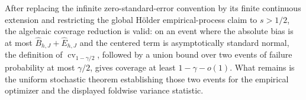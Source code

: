 After replacing the infinite zero-standard-error convention by its finite continuous extension and restricting the global Hölder empirical-process claim to \(s>1/2\), the algebraic coverage reduction is valid: on an event where the absolute bias is at most \(\widehat B_{h,J}+\widehat E_{h,J}\) and the centered term is asymptotically standard normal, the definition of \(\operatorname{cv}_{1-\gamma/2}\), followed by a union bound over two events of failure probability at most \(\gamma/2\), gives coverage at least \(1-\gamma-o(1)\). What remains is the uniform stochastic theorem establishing those two events for the empirical optimizer and the displayed foldwise variance statistic.
